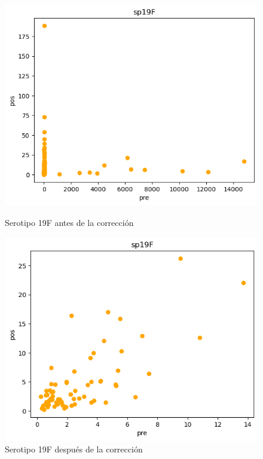 \begin{figure}[H]
    \begin{minipage}{0.45\textwidth}
        \centering
        \includegraphics[width=\linewidth]{Graphics/sp19fd.png}
        \caption{Serotipo 19F antes de la corrección}
        \label{fig:sp19fd}
    \end{minipage}%
    \hfill
    \begin{minipage}{0.45\textwidth}
        \centering
        \includegraphics[width=\linewidth]{Graphics/sp19fc.png}
        \caption{Serotipo 19F después de la corrección}
        \label{fig:sp19f}
    \end{minipage}
\end{figure}

